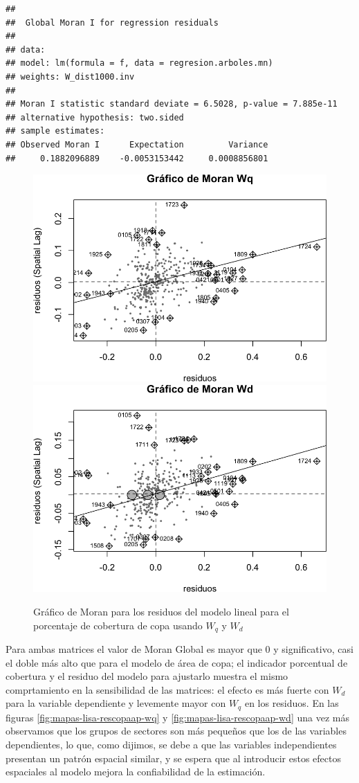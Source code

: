 \documentclass[12pt,]{book}
\begin{document}
\begin{verbatim}
## 
##  Global Moran I for regression residuals
## 
## data:  
## model: lm(formula = f, data = regresion.arboles.mn)
## weights: W_dist1000.inv
## 
## Moran I statistic standard deviate = 6.5028, p-value = 7.885e-11
## alternative hypothesis: two.sided
## sample estimates:
## Observed Moran I      Expectation         Variance 
##     0.1882096889    -0.0053153442     0.0008856801
\end{verbatim}

\begin{figure}
\includegraphics[width=0.49\linewidth]{tesis-unigis_files/figure-latex/moranplot-rescopaap-w-1} \includegraphics[width=0.49\linewidth]{tesis-unigis_files/figure-latex/moranplot-rescopaap-w-2} \caption{Gráfico de Moran para los residuos del modelo lineal para el porcentaje de cobertura de copa usando $W_{q}$ y $W_{d}$}\label{fig:moranplot-rescopaap-w}
\end{figure}

Para ambas matrices el valor de Moran Global es mayor que 0 y
significativo, casi el doble más alto que para el modelo de área de
copa; el indicador porcentual de cobertura y el residuo del modelo para
ajustarlo muestra el mismo comprtamiento en la sensibilidad de las
matrices: el efecto es más fuerte con \(W_d\) para la variable
dependiente y levemente mayor con \(W_q\) en los residuos. En las
figuras \ref{fig:mapas-lisa-rescopaap-wq} y
\ref{fig:mapas-lisa-rescopaap-wd} una vez más observamos que los grupos
de sectores son más pequeños que los de las variables dependientes, lo
que, como dijimos, se debe a que las variables independientes presentan
un patrón espacial similar, y se espera que al introducir estos efectos
espaciales al modelo mejora la confiabilidad de la estimación.
\end{document}
